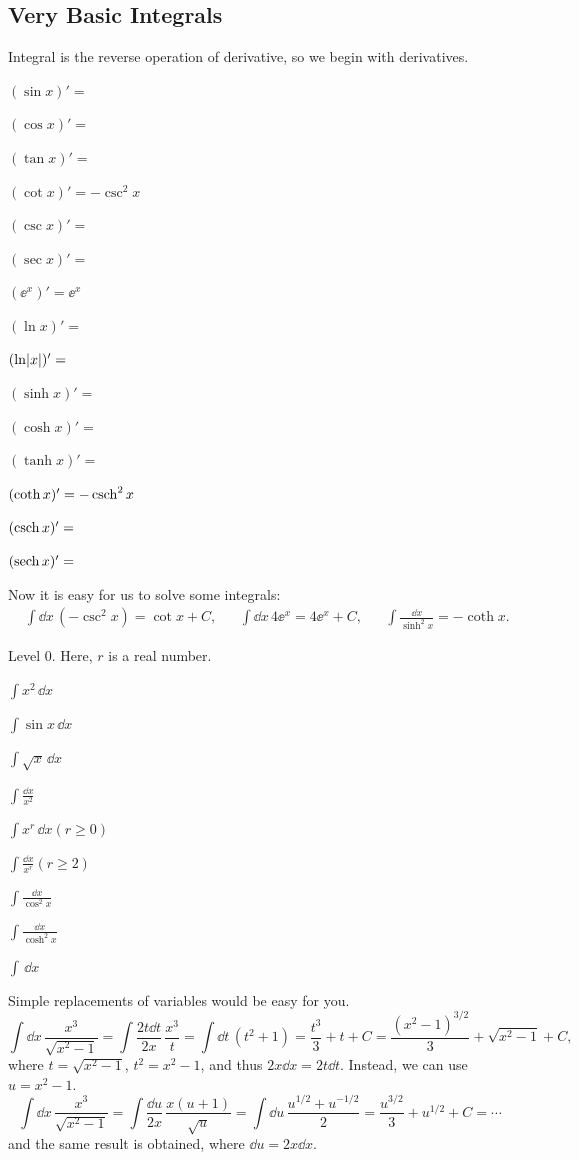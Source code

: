 \documentclass[11pt,pdfa,lastpage]{MishoNote}
\newcommand\intdx{\displaystyle\int\!\dd x\,}
\newcommand\INT[2][\relax]{\item$\displaystyle\int\!#2\,\dd x$\ifx\relax#1\relax\relax\relax\else{\quad#1}\fi}
\newcommand\INN[2][\relax]{\item$\displaystyle\int\!#2$\ifx\relax#1\relax\relax\relax\else{\quad#1}\fi}
\begin{document}
\subsection{Very Basic Integrals}
Integral is the reverse operation of derivative, so we begin with derivatives.
\begin{menumerate}{3}
  \item[\textbullet] $(\sin x)'=$
  \item[\textbullet] $(\cos x)'=$
  \item[\textbullet] $(\tan x)'=$
  \item[\textbullet] $(\cot x)'=-\csc^2x$
  \item[\textbullet] $(\csc x)'=$
  \item[\textbullet] $(\sec x)'=$
  \item[\textbullet] $(\ee^x)'=\ee^x$
  \item[\textbullet] $(\ln x)'=$
  \item[\textbullet] $(\ln\abs{x})'=$
  \item[\textbullet] $(\sinh x)'=$
  \item[\textbullet] $(\cosh x)'=$
  \item[\textbullet] $(\tanh x)'=$
  \item[\textbullet] $(\coth x)'=-\operatorname{\mathrm{csch}}^2x$
  \item[\textbullet] $(\operatorname{\mathrm{csch}} x)'=$
  \item[\textbullet] $(\operatorname{\mathrm{sech}} x)'=$
\end{menumerate}
\begin{quizzes}
\end{quizzes}
Now it is easy for us to solve some integrals:
\begin{align}
  &\intdx (-\csc^2x)=\cot x+C,&
  &\intdx 4\ee^x=4\ee^x+C,&
  &\int \frac{\dd x}{\sinh^2x}=-\coth x.
\end{align}


\begin{problems}
\Problem[A] Level 0. Here, $r$ is a real number.
\begin{menumerate}{3}
  \INT{x^2}
  \INT{\sin x}
  \INT{\sqrt x}
  \INN{\frac{\dd x}{x^2}}
  \INT[$(r\ge 0)$]{x^r}
  \INN[$(r\ge 2)$]{\frac{\dd x}{x^r}}
  \INN{\frac{\dd x}{\cos^2x}}
  \INN{\frac{\dd x}{\cosh^2x}}
  \INT{}
\end{menumerate}
\end{problems}

Simple replacements of variables would be easy for you.
\[
\intdx\frac{x^3}{\sqrt{x^2-1}}= \int\!\frac{2t\dd t}{2x}\,\frac{x^3}{t}=\int\!\dd t\,(t^2+1)=\frac{t^3}3+t+C=
\frac{(x^2-1)^{3/2}}3+\sqrt{x^2-1}+C,
\]
where $t=\sqrt{x^2-1}$, $t^2=x^2-1$, and thus $2x\dd x=2t\dd t$. Instead, we can use $u=x^2-1$.
\[
\intdx\frac{x^3}{\sqrt{x^2-1}}= \int\!\frac{\dd u}{2x}\,\frac{x(u+1)}{\sqrt{u}}
=\int\!\dd u\,\frac{u^{1/2}+u^{-1/2}}2
=\frac{u^{3/2}}{3}+u^{1/2}+C=\cdots
\]
and the same result is obtained, where $\dd u=2x\dd x$.
\end{document}
